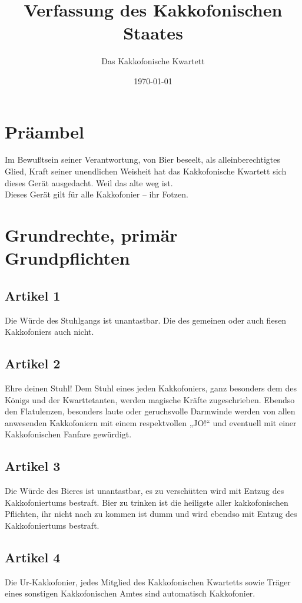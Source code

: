 \documentclass[ngerman, fontsize=12pt, parskip=half, footsepline]{scrartcl}
\title{Verfassung des Kakkofonischen Staates}
\author{Das Kakkofonische Kwartett}
\date{\today}
\begin{document}
\maketitle{}
\section*{Präambel}

Im Bewußtsein seiner Verantwortung, von Bier beseelt, als alleinberechtigtes Glied, Kraft seiner
unendlichen Weisheit hat das Kakkofonische Kwartett sich dieses Gerät ausgedacht. Weil das alte weg ist.\\
Dieses Gerät gilt für alle Kakkofonier – ihr Fotzen.

\section{Grundrechte, primär Grundpflichten}

\subsection*{Artikel 1}
Die Würde des Stuhlgangs ist unantastbar. Die des gemeinen oder auch fiesen Kakkofoniers auch nicht.

\subsection*{Artikel 2}
Ehre deinen Stuhl! Dem Stuhl eines jeden Kakkofoniers, ganz besonders dem des Königs und der Kwarttetanten, werden magische Kräfte zugeschrieben. Ebendso den Flatulenzen, besonders laute oder geruchsvolle Darmwinde werden von allen anwesenden Kakkofoniern mit einem respektvollen „JO!“ und eventuell mit einer Kakkofonischen Fanfare gewürdigt.

\subsection*{Artikel 3}
Die Würde des Bieres ist unantastbar, es zu verschütten wird mit  Entzug des Kakkofoniertums bestraft. Bier zu trinken ist die heiligste aller kakkofonischen Pflichten, ihr nicht nach zu kommen ist dumm und wird ebendso mit Entzug des Kakkofoniertums bestraft.

\subsection*{Artikel 4}
Die Ur-Kakkofonier, jedes Mitglied des Kakkofonischen Kwartetts sowie Träger eines sonstigen Kakkofonischen Amtes sind automatisch Kakkofonier.
\end{document}
